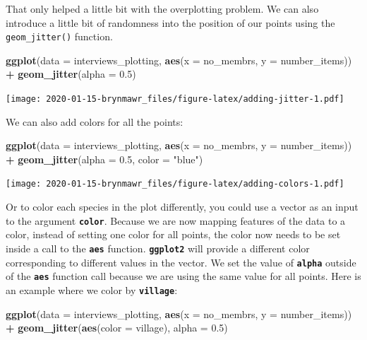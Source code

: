 \documentclass[]{book}
\newenvironment{Shaded}{\begin{snugshade}}{\end{snugshade}}
\newcommand{\KeywordTok}[1]{\textcolor[rgb]{0.13,0.29,0.53}{\textbf{#1}}}
\newcommand{\DataTypeTok}[1]{\textcolor[rgb]{0.13,0.29,0.53}{#1}}
\newcommand{\FloatTok}[1]{\textcolor[rgb]{0.00,0.00,0.81}{#1}}
\newcommand{\StringTok}[1]{\textcolor[rgb]{0.31,0.60,0.02}{#1}}
\newcommand{\OperatorTok}[1]{\textcolor[rgb]{0.81,0.36,0.00}{\textbf{#1}}}
\newcommand{\NormalTok}[1]{#1}
\begin{document}
That only helped a little bit with the overplotting problem. We can also
introduce a little bit of randomness into the position of our points
using the \texttt{geom\_jitter()} function.

\begin{Shaded}
\begin{Highlighting}[]
\KeywordTok{ggplot}\NormalTok{(}\DataTypeTok{data =}\NormalTok{ interviews_plotting, }\KeywordTok{aes}\NormalTok{(}\DataTypeTok{x =}\NormalTok{ no_membrs, }\DataTypeTok{y =}\NormalTok{ number_items)) }\OperatorTok{+}
\StringTok{    }\KeywordTok{geom_jitter}\NormalTok{(}\DataTypeTok{alpha =} \FloatTok{0.5}\NormalTok{)}
\end{Highlighting}
\end{Shaded}

\texttt{[image: 2020-01-15-brynmawr\_files/figure-latex/adding-jitter-1.pdf]}

We can also add colors for all the points:

\begin{Shaded}
\begin{Highlighting}[]
\KeywordTok{ggplot}\NormalTok{(}\DataTypeTok{data =}\NormalTok{ interviews_plotting, }\KeywordTok{aes}\NormalTok{(}\DataTypeTok{x =}\NormalTok{ no_membrs, }\DataTypeTok{y =}\NormalTok{ number_items)) }\OperatorTok{+}
\StringTok{    }\KeywordTok{geom_jitter}\NormalTok{(}\DataTypeTok{alpha =} \FloatTok{0.5}\NormalTok{, }\DataTypeTok{color =} \StringTok{"blue"}\NormalTok{)}
\end{Highlighting}
\end{Shaded}

\texttt{[image: 2020-01-15-brynmawr\_files/figure-latex/adding-colors-1.pdf]}

Or to color each species in the plot differently, you could use a vector
as an input to the argument \textbf{\texttt{color}}. Because we are now
mapping features of the data to a color, instead of setting one color
for all points, the color now needs to be set inside a call to the
\textbf{\texttt{aes}} function. \textbf{\texttt{ggplot2}} will provide a
different color corresponding to different values in the vector. We set
the value of \textbf{\texttt{alpha}} outside of the
\textbf{\texttt{aes}} function call because we are using the same value
for all points. Here is an example where we color by
\textbf{\texttt{village}}:

\begin{Shaded}
\begin{Highlighting}[]
\KeywordTok{ggplot}\NormalTok{(}\DataTypeTok{data =}\NormalTok{ interviews_plotting, }\KeywordTok{aes}\NormalTok{(}\DataTypeTok{x =}\NormalTok{ no_membrs, }\DataTypeTok{y =}\NormalTok{ number_items)) }\OperatorTok{+}
\StringTok{    }\KeywordTok{geom_jitter}\NormalTok{(}\KeywordTok{aes}\NormalTok{(}\DataTypeTok{color =}\NormalTok{ village), }\DataTypeTok{alpha =} \FloatTok{0.5}\NormalTok{)}
\end{Highlighting}
\end{Shaded}
\end{document}

